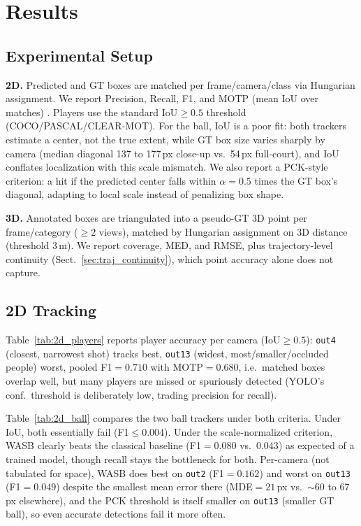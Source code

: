 \documentclass[runningheads]{llncs}
\begin{document}
\section{Results}
\label{sec:results}

\subsection{Experimental Setup}
\label{sec:exp_setup}

\textbf{2D.} Predicted and GT boxes are matched per frame/camera/class via Hungarian assignment. We report Precision, Recall, F1, and MOTP (mean IoU over matches) \cite{Bernardin2008}. Players use the standard IoU$\geq0.5$ threshold (COCO/PASCAL/CLEAR-MOT). For the ball, IoU is a poor fit: both trackers estimate a center, not the true extent, while GT box size varies sharply by camera (median diagonal 137 to 177\,px close-up vs.\ 54\,px full-court), and IoU conflates localization with this scale mismatch. We also report a PCK-style criterion: a hit if the predicted center falls within $\alpha=0.5$ times the GT box's diagonal, adapting to local scale instead of penalizing box shape.

\textbf{3D.} Annotated boxes are triangulated into a pseudo-GT 3D point per frame/category ($\geq2$ views), matched by Hungarian assignment on 3D distance (threshold 3\,m). We report coverage, MED, and RMSE, plus trajectory-level continuity (Sect.~\ref{sec:traj_continuity}), which point accuracy alone does not capture.

\subsection{2D Tracking}
\label{sec:2d_results}

Table~\ref{tab:2d_players} reports player accuracy per camera (IoU$\geq0.5$): \texttt{out4} (closest, narrowest shot) tracks best, \texttt{out13} (widest, most/smaller/occluded people) worst, pooled F1$=0.710$ with MOTP$=0.680$, i.e.\ matched boxes overlap well, but many players are missed or spuriously detected (YOLO's conf.\ threshold is deliberately low, trading precision for recall).

Table~\ref{tab:2d_ball} compares the two ball trackers under both criteria. Under IoU, both essentially fail (F1$\leq0.004$). Under the scale-normalized criterion, WASB clearly beats the classical baseline (F1$=0.080$ vs.\ $0.043$) as expected of a trained model, though recall stays the bottleneck for both. Per-camera (not tabulated for space), WASB does best on \texttt{out2} (F1$=0.162$) and worst on \texttt{out13} (F1$=0.049$) despite the smallest mean error there (MDE$=21$\,px vs.\ $\sim$60 to 67\,px elsewhere), and the PCK threshold is itself smaller on \texttt{out13} (smaller GT ball), so even accurate detections fail it more often.
\end{document}
